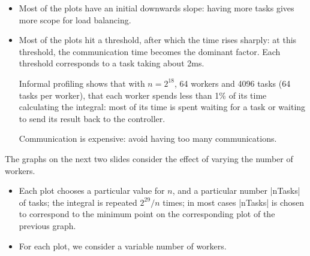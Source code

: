 

\begin{slide}

\begin{itemize}
\item Most of the plots have an initial downwards slope: having more tasks
gives more scope for load balancing.

\item Most of the plots hit a threshold, after which the time rises sharply:
at this threshold, the communication time becomes the dominant factor.
Each threshold corresponds to a task taking about 2ms.

Informal profiling shows that with $n = 2^{18}$, 64 workers and 4096 tasks (64
tasks per worker), that each worker spends less than 1\% of its time
calculating the integral: most of its time is spent waiting for a task or
waiting to send its result back to the controller. 

Communication is expensive: avoid having too many communications. 

\end{itemize}
\end{slide}


\begin{slide}

The graphs on the next two slides consider the effect of varying the number of
workers.
%
\begin{itemize}
\item Each plot chooses a particular value for $n$, and a particular number
|nTasks| of tasks; the integral is repeated $2^{29}/n$ times; in most cases
|nTasks| is chosen to correspond to the minimum point on the corresponding
plot of the previous graph.

\item For each plot, we consider a variable number of workers.
\end{itemize}
\end{slide}


